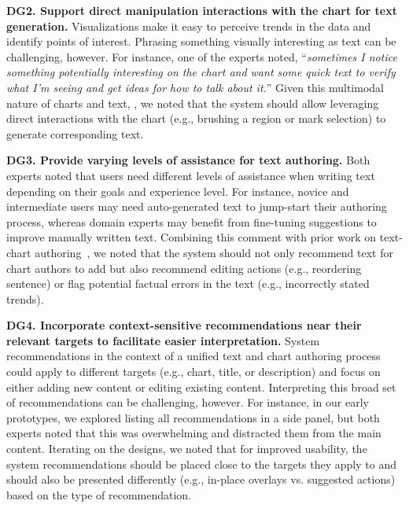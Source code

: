 \vspace{.5em}
\noindent\textbf{DG2. Support direct manipulation interactions with the chart for text generation.}
Visualizations make it easy to perceive trends in the data and identify points of interest.
Phrasing something visually interesting as text can be challenging, however. For instance, one of the experts noted, ``\textit{sometimes I notice something potentially interesting on the chart and want some quick text to verify what I'm seeing and get ideas for how to talk about it.}'' Given this multimodal nature of charts and text, , we noted that the system should allow leveraging direct interactions with the chart (e.g., brushing a region or mark selection) to generate corresponding text.

\vspace{.5em}
\noindent\textbf{DG3. Provide varying levels of assistance for text authoring.}
Both experts noted that users need different levels of assistance when writing text depending on their goals and experience level.
For instance, novice and intermediate users may need auto-generated text to jump-start their authoring process, whereas domain experts may benefit from fine-tuning suggestions to improve manually written text.
Combining this comment with prior work on text-chart authoring~\cite{stokes2022striking,kim2023emphasischecker}, we noted that the system should not only recommend text for chart authors to add but also recommend editing actions (e.g., reordering sentence) or flag potential factual errors in the text (e.g., incorrectly stated trends).

\vspace{.5em}
\noindent\textbf{DG4. Incorporate context-sensitive recommendations near their relevant targets to facilitate easier interpretation.}
System recommendations in the context of a unified text and chart authoring process could apply to different targets (e.g., chart, title, or description) and focus on either adding new content or editing existing content.
Interpreting this broad set of recommendations can be challenging, however.
For instance, in our early prototypes, we explored listing all recommendations in a side panel, but both experts noted that this was overwhelming and distracted them from the main content.
Iterating on the designs, we noted that for improved usability, the system recommendations should be placed close to the targets they apply to and should also be presented differently (e.g., in-place overlays vs. suggested actions) based on the type of recommendation.


